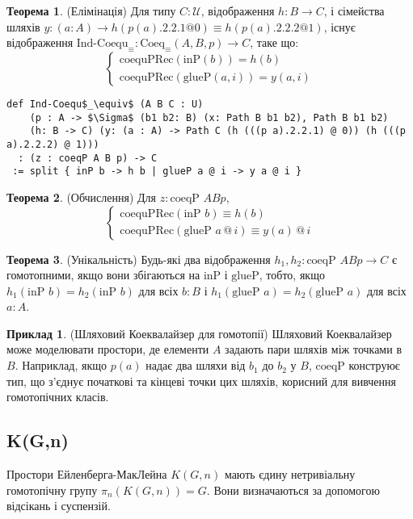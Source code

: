 \documentclass{article}
\theoremstyle{definition}
\newtheorem{theorem}{Теорема}
\newtheorem{example}{Приклад}
\begin{document}
\begin{theorem} (Елімінація)
Для типу \( C : \mathcal{U} \), відображення \( h : B \to C \),
і сімейства шляхів \( y : (a : A) \to h(p(a).2.2.1  @ 0) \equiv h(p(a).2.2.2 @ 1) \),
існує відображення \( \text{Ind-Coequ}_\equiv : \text{Coeq}_\equiv(A,B,p) \to C \), таке що:
\[
\begin{cases}
\text{coequPRec}(\text{inP}(b)) = h(b) \\
\text{coequPRec}(\text{glueP}(a,i)) = y(a,i)
\end{cases}
\]
\begin{lstlisting}[mathescape=true]
def Ind-Coequ$_\equiv$ (A B C : U)
    (p : A -> $\Sigma$ (b1 b2: B) (x: Path B b1 b2), Path B b1 b2)
    (h: B -> C) (y: (a : A) -> Path C (h (((p a).2.2.1) @ 0)) (h (((p a).2.2.2) @ 1)))
  : (z : coeqP A B p) -> C
 := split { inP b -> h b | glueP a @ i -> y a @ i }
\end{lstlisting}
\end{theorem}

\begin{theorem} (Обчислення)
Для \( z : \text{coeqP } A B p \),
\[
\begin{cases}
\text{coequPRec}(\text{inP } b) \equiv h(b) \\
\text{coequPRec}(\text{glueP } a \, @ \, i) \equiv y(a) \, @ \, i
\end{cases}
\]
\end{theorem}

\begin{theorem} (Унікальність)
Будь-які два відображення \( h_1, h_2 : \text{coeqP } A B p \to C \) є гомотопними,
якщо вони збігаються на \( \text{inP} \) і \( \text{glueP} \), тобто,
якщо \( h_1(\text{inP } b) = h_2(\text{inP } b) \) для всіх \( b : B \)
і \( h_1(\text{glueP } a) = h_2(\text{glueP } a) \) для всіх \( a : A \).
\end{theorem}

\begin{example} (Шляховий Коеквалайзер для гомотопії)
Шляховий Коеквалайзер може моделювати простори, де елементи \( A \) задають
пари шляхів між точками в \( B \). Наприклад, якщо \( p(a) \) надає
два шляхи від \( b_1 \) до \( b_2 \) у \( B \), \( \text{coeqP} \) конструює тип,
що з’єднує початкові та кінцеві точки цих шляхів,
корисний для вивчення гомотопічних класів.
\end{example}

\newpage
\subsection{K(G,n)}
Простори Ейленберга-МакЛейна \( K(G,n) \) мають єдину нетривіальну
гомотопічну групу \( \pi_n(K(G,n)) = G \). Вони визначаються за допомогою відсікань і суспензій.
\end{document}
